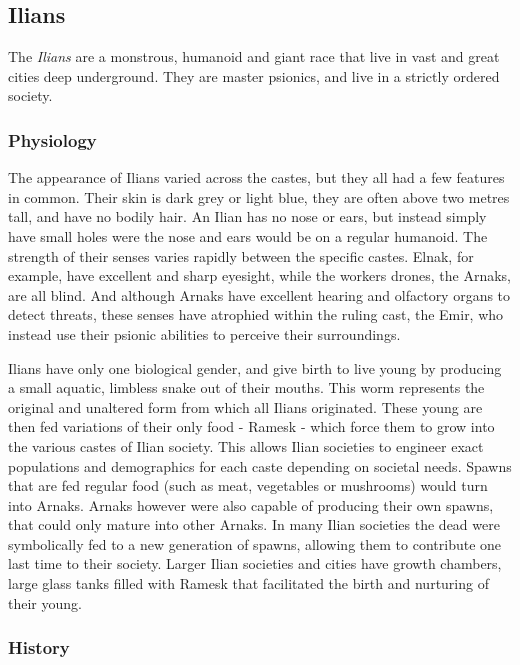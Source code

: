 \subsection{Ilians}
\label{sec:Ilians}

The \emph{Ilians} are a monstrous, humanoid and giant race that live in vast
and great cities deep underground. They are master psionics, and live in a
strictly ordered society.

\subsubsection{Physiology}

The appearance of Ilians varied across the castes, but they all had a few
features in common. Their skin is dark grey or light blue, they are often
above two metres tall, and have no bodily hair. An Ilian has no nose or ears,
but instead simply have small holes were the nose and ears would be on a
regular humanoid. The strength of their senses varies rapidly between the
specific castes. Elnak, for example, have excellent and sharp eyesight, while
the workers drones, the Arnaks, are all blind. And although Arnaks have
excellent hearing and olfactory organs to detect threats, these senses have
atrophied within the ruling cast, the Emir, who instead use their psionic
abilities to perceive their surroundings.

Ilians have only one biological gender, and give birth to live young by
producing a small aquatic, limbless snake out of their mouths. This worm
represents the original and unaltered form from which all Ilians
originated. These young are then fed variations of their only food - Ramesk -
which force them to grow into the various castes of Ilian society. This allows
Ilian societies to engineer exact populations and demographics for each caste
depending on societal needs. Spawns that are fed regular food (such as meat,
vegetables or mushrooms) would turn into Arnaks. Arnaks however were also
capable of producing their own spawns, that could only mature into other
Arnaks. In many Ilian societies the dead were symbolically fed to a new
generation of spawns, allowing them to contribute one last time to their
society. Larger Ilian societies and cities have growth chambers, large glass
tanks filled with Ramesk that facilitated the birth and nurturing of their
young.

\subsubsection{History}

